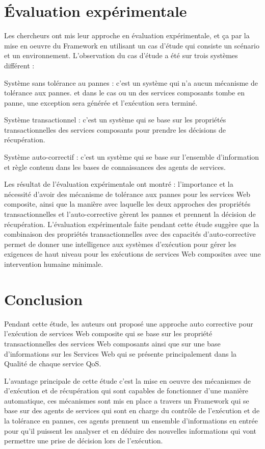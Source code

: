 \section{Évaluation expérimentale }

Les chercheurs ont mis leur approche en évaluation expérimentale, et ça par la mise en oeuvre du Framework  en utilisant un cas d'étude qui consiste un scénario et un environnement.
L'observation du cas d'étude a été sur trois systèmes différent :

Système sans tolérance au pannes : c'est un système qui n'a aucun mécanisme de tolérance aux pannes. et dans le cas ou un des services composants tombe en panne, une exception sera générée et l'exécution sera terminé.

Système transactionnel : c'est un système qui se base sur les propriétés transactionnelles des services composants pour prendre les décisions de récupération.

Système auto-correctif :  c'est un système qui se base sur l'ensemble d'information et règle contenu dans les bases de connaissances des agents de services.


Les résultat de l'évaluation expérimentale ont montré : l'importance et la nécessité d'avoir des mécanisme de tolérance aux pannes pour les services Web composite, ainsi que la manière avec laquelle les deux approches des propriétés transactionnelles et l'auto-corrective gèrent les pannes et prennent la décision de récupération.
L'évaluation expérimentale faite pendant cette étude suggère que la combinaison des propriétés transactionnelles avec des capacités d'auto-corrective permet de donner une intelligence aux systèmes d'exécution pour gérer les exigences de haut niveau pour les exécutions de services Web composites avec une intervention humaine minimale\cite{1}.

\section{Conclusion}

Pendant cette étude, les auteurs ont proposé une approche auto corrective pour l'exécution de services Web composite qui se base sur les propriété transactionnelles des services Web composants ainsi que sur une base d'informations sur les Services Web qui se présente principalement dans la Qualité de chaque service QoS.

L'avantage principale de cette étude c'est la mise en oeuvre des mécanismes de d'exécution et de récupération qui sont capables de fonctionner d'une manière automatique, ces mécanismes sont mis en place a travers un Framework qui se base sur des agents de services qui sont en charge du contrôle de l'exécution  et de la tolérance en pannes, ces agents prennent un ensemble d'informations en entrée pour qu'il puissent les analyser et en déduire des nouvelles informations qui vont permettre une prise de décision lors de l'exécution.

